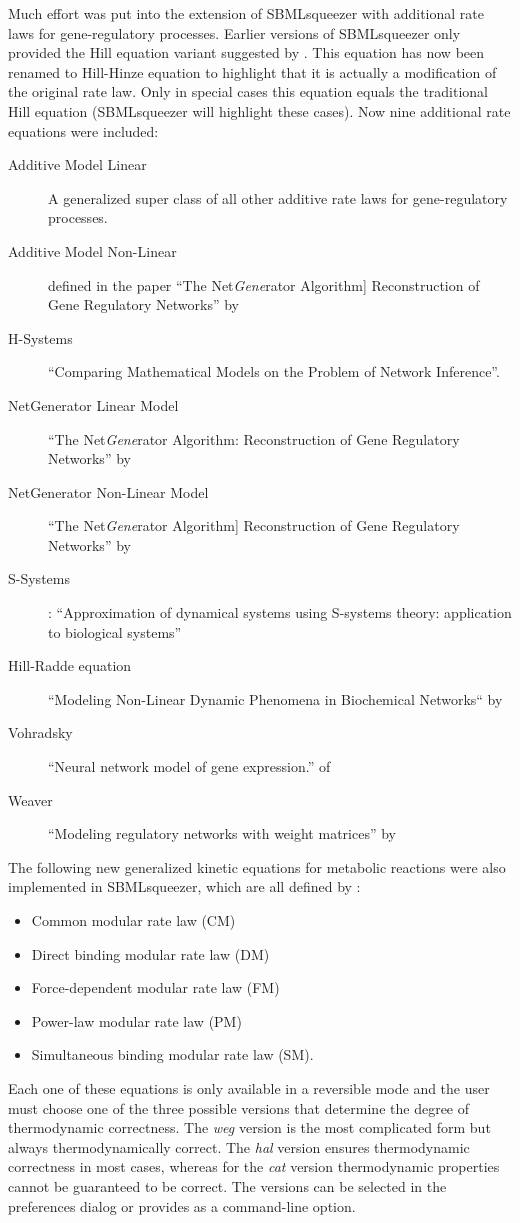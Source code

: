 Much effort was put into the extension of SBMLsqueezer with additional rate laws
for gene-regulatory processes. Earlier versions of SBMLsqueezer only provided
the Hill equation variant suggested by \citet{Hinze2007}. This equation has now
been renamed to Hill-Hinze equation to highlight that it is actually a
modification of the original rate law. Only in special cases this equation
equals the traditional Hill equation (SBMLsqueezer will highlight these cases).
Now nine additional rate equations were included:
\begin{description}
\item[Additive Model Linear] A generalized super class of all other additive rate laws for gene-regulatory processes.
\item[Additive Model Non-Linear] defined in the paper ``The Net\emph{Gene}rator Algorithm] Reconstruction of Gene Regulatory Networks'' by \citealp*{Toepfer2007}
\item[H-Systems] \citealp*{Spieth2006} ``Comparing Mathematical Models on the Problem of Network Inference''.
\item[NetGenerator Linear Model] ``The Net\emph{Gene}rator Algorithm: Reconstruction of Gene Regulatory Networks'' by \citealp*{Toepfer2007}
\item[NetGenerator Non-Linear Model] ``The Net\emph{Gene}rator Algorithm] Reconstruction of Gene Regulatory Networks'' by \citealp*{Toepfer2007}
\item[S-Systems] \citet{Tournier2005}: ``Approximation of dynamical systems using S-systems theory: application to biological systems''
\item[Hill-Radde equation] ``Modeling Non-Linear Dynamic Phenomena in Biochemical Networks`` by \citealp*{Radde2007}
\item[Vohradsky] ``Neural network model of gene expression.'' of \citealp{Vu2007}
\item[Weaver] ``Modeling regulatory networks with weight matrices'' by \citealp*{Weaver1999}
\end{description}

The following new generalized kinetic equations for metabolic reactions were
also implemented in SBMLsqueezer, which are all defined by \citet{Liebermeister2010}:
\begin{itemize}
\item Common modular rate law (CM)
\item Direct binding modular rate law (DM)
\item Force-dependent modular rate law (FM)
\item Power-law modular rate law (PM)
\item Simultaneous binding modular rate law (SM).
\end{itemize}
Each one of these equations is only available in a reversible mode and the user
must choose one of the three possible versions that determine the degree of
thermodynamic correctness. The \emph{weg} version is the most complicated form but
always thermodynamically correct. The \emph{hal} version ensures thermodynamic
correctness in most cases, whereas for the \emph{cat} version thermodynamic properties
cannot be guaranteed to be correct. The versions can be selected in the
preferences dialog or provides as a command-line option.

